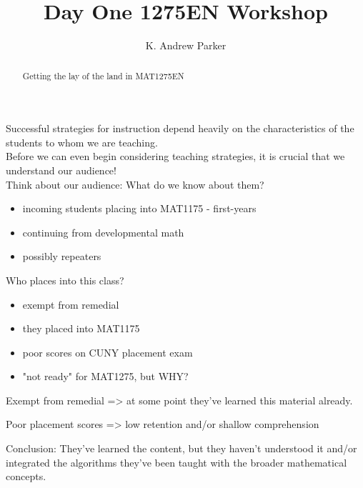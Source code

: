 \documentclass{ximera}
\title{Day One 1275EN Workshop}
\author{K. Andrew Parker}
\begin{document}
\begin{abstract}
Getting the lay of the land in MAT1275EN
\end{abstract}

\maketitle

Successful strategies for instruction depend heavily on the characteristics of the students to whom we are teaching.\\

Before we can even begin considering teaching strategies, it is crucial that we understand our audience! \\


Think about our audience: What do we know about them?
\begin{itemize}
\item incoming students placing into MAT1175 - first-years
\item continuing from developmental math
\item possibly repeaters
\end{itemize}

Who places into this class?
\begin{itemize}
\item exempt from remedial
\item they placed into MAT1175
\item poor scores on CUNY placement exam
\item "not ready" for MAT1275, but WHY?
\end{itemize}

\begin{lemma}
Exempt from remedial => at some point they've learned this material already. \\
\end{lemma}

\begin{lemma}
Poor placement scores => low retention and/or shallow comprehension \\
\end{lemma}

\begin{theorem}
Conclusion: They've learned the content, but they haven't understood it
and/or integrated the algorithms they've been taught with the broader
mathematical concepts.\\
\end{theorem}
\end{document}
